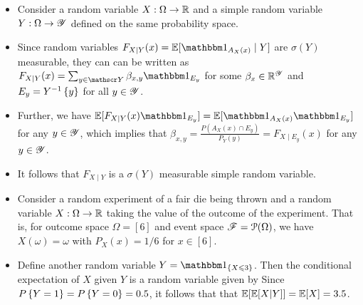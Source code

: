 \documentclass[12pt,aspectratio=169]{beamer}
\begin{document}
\begin{frame}
\begin{Example} 
\begin{itemize}
\item <1-> Consider a random variable $X: \Omega \to \mathbb{R}$ and a simple random variable $Y:\Omega\to\mathscr{Y}$ defined on the same probability space. 
\item <2-> Since random variables $F_{X\mid Y}(x) = \E[\Ind{A_X(x)}\mid Y]$ are $\sigma(Y)$ measurable, 
they can can be written as $F_{X\mid Y}(x) = \sum_{y\in\sY}\beta_{x,y}\Ind{E_y}$ for some $\beta_x\in\mathbb{R}^{\mathscr{Y}}$ and $E_y = Y^{-1}\left\{y\right\}$ for all $y \in \mathscr{Y}$. 
\item <3-> Further, we have $\E[F_{X\mid Y}(x)\Ind{E_y}] = \E[\Ind{A_X(x)}\Ind{E_y}]$ for any $y \in \mathscr{Y}$, 
which implies that $\beta_{x,y} =\frac{P(A_X(x)\cap E_y)}{P_Y(y)} = F_{X\mid E_y}(x)$ for any $y \in \mathscr{Y}$. 
\item <4-> It follows that $F_{X\mid Y}$ is a $\sigma(Y)$ measurable simple random variable. 
\end{itemize}
\end{Example}
\end{frame}

\begin{frame}



\begin{Example}
\begin{itemize}
\item <1-> Consider a random experiment of a fair die being thrown and a random variable $X:\Omega\to\mathbb{R}$ taking the value of the outcome of the experiment. 
That is, for outcome space $\Omega = [6]$ and event space $\mathscr{F} = \mathcal{P}(\Omega)$, we have  $X(\omega) = \omega$ with $P_X(x) = 1/6$ for $x \in [6]$. 
\item <2-> Define another random variable $Y = \SetIn{X \le 3}$.
Then the conditional expectation of $X$ given $Y$ is a random variable given by
Since $P\left\{Y = 1\right\} = P\left\{Y = 0\right\} = 0.5$, it follows that that $\mathbb{E}[\mathbb{E}[X|Y]] = \mathbb{E}[X]  = 3.5$.
\end{itemize}
\end{Example}
\end{frame}
\end{document}
